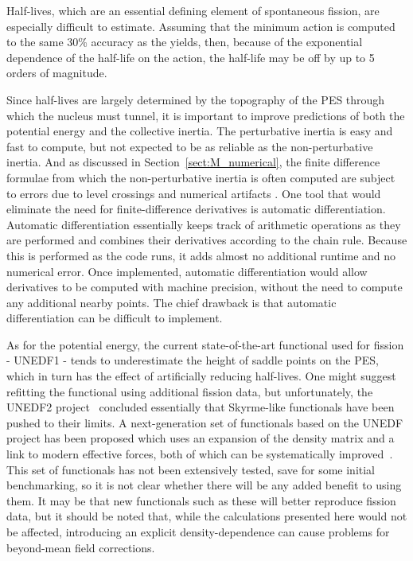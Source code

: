 Half-lives, which are an essential defining element of spontaneous fission, are especially difficult to estimate. Assuming that the minimum action is computed to the same 30\% accuracy as the yields, then, because of the exponential dependence of the half-life on the action, the half-life may be off by up to 5 orders of magnitude.



Since half-lives are largely determined by the topography of the PES through which the nucleus must tunnel, it is important to improve predictions of both the potential energy and the collective inertia. The perturbative inertia is easy and fast to compute, but not expected to be as reliable as the non-perturbative inertia. And as discussed in Section~\ref{sect:M_numerical}, the finite difference formulae from which the non-perturbative inertia is often computed are subject to errors due to level crossings and numerical artifacts . One tool that would eliminate the need for finite-difference derivatives is automatic differentiation. Automatic differentiation essentially keeps track of arithmetic operations as they are performed and combines their derivatives according to the chain rule. Because this is performed as the code runs, it adds almost no additional runtime and no numerical error. Once implemented, automatic differentiation would allow derivatives to be computed with machine precision, without the need to compute any additional nearby points. The chief drawback is that automatic differentiation can be difficult to implement.

As for the potential energy, the current state-of-the-art functional used for fission - UNEDF1 - tends to underestimate the height of saddle points on the PES, which in turn has the effect of artificially reducing half-lives. One might suggest refitting the functional using additional fission data, but unfortunately, the UNEDF2 project~\cite{Kortelainen2014} concluded essentially that Skyrme-like functionals have been pushed to their limits. A next-generation set of functionals based on the UNEDF project has been proposed which uses an expansion of the density matrix and a link to modern effective forces, both of which can be systematically improved~\cite{NavarroPerez2018}. This set of functionals has not been extensively tested, save for some initial benchmarking, so it is not clear whether there will be any added benefit to using them. It may be that new functionals such as these will better reproduce fission data, but it should be noted that, while the calculations presented here would not be affected, introducing an explicit density-dependence can cause problems for beyond-mean field corrections. %

